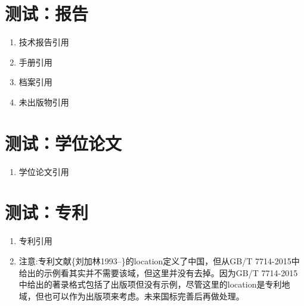 \documentclass[twoside]{article}
\begin{document}
\section{测试：报告}
\begin{refsection}
\begin{enumerate}
  \item 技术报告引用
  \cite{Calkin2011-8-9,Eggrers--,Humphrey1971--,DTFHA1990--,WHO1970--,汤万金2013-09-30--,中华人民共和国国务院新闻办公室2013-04-16--}
  \item 手册引用
  \cite{Lehman2013--,Lehman2015,Mittelbach2015--,Oetiker2011--,Robertson2011--,Sommerfeldt2011--,Umeki2010--, 胡振震2016,吴凌云2007--}
  \item 档案引用\cite{中国第一历史档案馆2001--}
  \item 未出版物引用\cite{包太雷2013--}
\end{enumerate}

{
\printbibliography%
}
\end{refsection}


\section{测试：学位论文}
\begin{refsection}
\begin{enumerate}
  \item 学位论文引用\cite{CALMS1965--,马欢2011-27-27,吴云芳2003--,张若凌2004--,张志祥1998--}
\end{enumerate}

{
\printbibliography%
}
\end{refsection}


\section{测试：专利}
\begin{refsection}
\begin{enumerate}
  \item 专利引用\cite{KOSEKI2002--,TACHIBANA2002--,河北绿洲生态环境科技有限公司2001--,姜锡洲1989--,刘加林1993--,西安电子科技大学2002--,张凯军2012-04-05--}

  \item 注意:专利文献\{刘加林1993--\}的location定义了中国，但从GB/T 7714-2015中给出的示例看其实并不需要该域，但这里并没有去掉。因为GB/T 7714-2015中给出的著录格式包括了出版项但没有示例，尽管这里的location是专利地域，但也可以作为出版项来考虑。未来国标完善后再做处理。
\end{enumerate}

{
\printbibliography%
}
\end{refsection}
\end{document}
